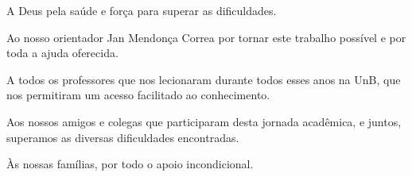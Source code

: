 A Deus pela saúde e força para superar as dificuldades.

Ao nosso orientador Jan Mendonça Correa por tornar este trabalho possível e por toda a ajuda oferecida.

A todos os professores que nos lecionaram durante todos esses anos na UnB, que nos permitiram um acesso facilitado ao conhecimento.

Aos nossos amigos e colegas que participaram desta jornada acadêmica, e juntos, superamos as diversas dificuldades encontradas.

Às nossas famílias, por todo o apoio incondicional.